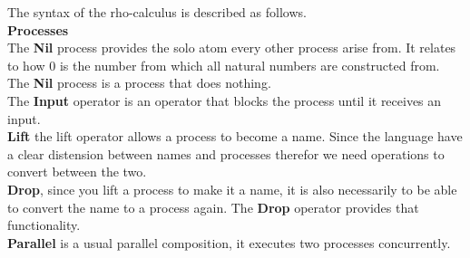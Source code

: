 The syntax of the rho-calculus is described as follows.\\





\textbf{Processes}\\ %
The \textbf{Nil} process provides the solo atom every other process arise from. It relates to how 0 is the number from which all natural numbers are constructed from. The \textbf{Nil} process is a process that does nothing.\\
The \textbf{Input} operator is an operator that blocks the process until it receives an input.\\
\textbf{Lift} the lift operator allows a process to become a name. Since the language have a clear distension between names and processes therefor we need operations to convert between the two.\\
\textbf{Drop}, since you lift a process to make it a name, it is also necessarily to be able to convert the name to a process again. The \textbf{Drop} operator provides that functionality. \\
\textbf{Parallel} is a usual parallel composition, it executes two processes concurrently.\\


